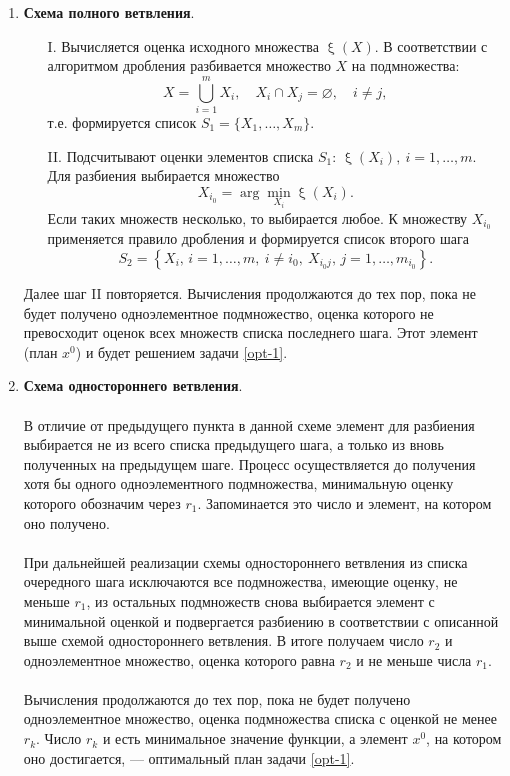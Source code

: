 \documentclass[a4paper, 12pt]{report}
\numberwithin{equation}{section}
\renewcommand{\xi}{\upxi}
\begin{document}
	\begin{enumerate}
		\item \textbf{Схема полного ветвления}.
		\begin{enumerate}
			\item[I.] Вычисляется оценка исходного множества $\xi(X)$. В соответствии с алгоритмом дробления разбивается множество $X$ на подмножества:
			\[
			X = \bigcup_{i=1}^{m} X_i, \quad X_i \cap X_j = \varnothing, \quad i \neq j,
			\]
			т.е. формируется список $S_1 = \{X_1, \ldots, X_m\}$.
			\item[II.] Подсчитывают оценки элементов списка $S_1$: $\xi(X_i),\ i = 1, \ldots, m$. Для разбиения выбирается множество $$X_{i_0} = \arg\underset{X_i}{\min}\xi(X_i).$$ Если таких множеств несколько, то выбирается любое. К множеству $X_{i_0}$ применяется правило дробления и формируется список второго шага
			\[
			S_2 = \left\{X_i,\, i=1,\ldots, m,\ i \neq i_0,\ X_{i_0j},\, j=1,\ldots, m_{i_0}\right\}.
			\]
		\end{enumerate}
		Далее шаг II повторяется.
		Вычисления продолжаются до тех пор, пока не будет получено одноэлементное подмножество, оценка которого не превосходит оценок всех множеств списка последнего шага. Этот элемент (план $x^0$) и будет решением задачи \eqref{opt-1}.
		\item \textbf{Схема одностороннего ветвления}.
		\\\\
		В отличие от предыдущего пункта в данной схеме элемент для разбиения выбирается не из всего списка предыдущего шага, а только из вновь полученных на предыдущем шаге. Процесс осуществляется до получения хотя бы одного одноэлементного подмножества, минимальную оценку которого обозначим через $r_1$. Запоминается это число и элемент, на котором оно получено.
		\\\\
		При дальнейшей реализации схемы одностороннего ветвления из списка очередного шага исключаются все подмножества, имеющие оценку, не меньше $r_1$, из остальных подмножеств снова выбирается элемент с минимальной оценкой и подвергается разбиению в соответствии с описанной выше схемой одностороннего ветвления. В итоге получаем число $r_2$ и одноэлементное множество, оценка которого равна $r_2$ и не меньше числа $r_1$.
		\\\\
		Вычисления продолжаются до тех пор, пока не будет получено одноэлементное множество, оценка подмножества списка с оценкой не менее $r_k$. Число $r_k$ и есть минимальное значение функции, а элемент $x^0$, на котором оно достигается, — оптимальный план задачи \eqref{opt-1}.
	\end{enumerate}
\end{document}
